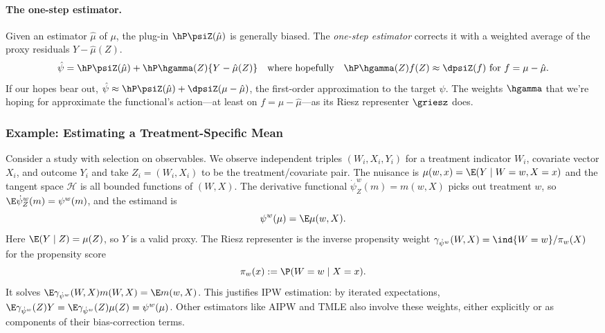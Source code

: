 \documentclass{article}
\begin{document}
\paragraph{The one-step estimator.}
Given an estimator $\hat\mu$ of $\mu$,
the plug-in $\hP \psiZ(\hat\mu)$
is generally biased.
The \emph{one-step estimator} corrects it
with a weighted average of the
proxy residuals $Y - \hat\mu(Z)$.
\begin{equation}\label{eq:one-step}
\hat\psi
  = \hP \psiZ(\hat\mu)
  + \hP \hgamma(Z) \{ Y - \hat\mu(Z) \}
  \qqtext{where hopefully}
  \hP \hgamma(Z) f(Z) \approx \dpsiZ(f)
  \text{ for } f = \mu - \hat\mu.
\end{equation}
If our hopes bear out,
$\hat\psi \approx \hP\psiZ(\hat\mu) + \dpsiZ(\mu - \hat\mu)$,
the first-order approximation
to the target $\psi$.
The weights $\hgamma$ that we're hoping for
approximate the functional's action---at
least on $f = \mu - \hat\mu$---as
its Riesz representer $\griesz$ does.

\subsubsection{Example: Estimating a Treatment-Specific Mean}
\label{ex:treatment-specific-mean}
Consider a study with selection on observables.
We observe independent triples $(W_i,X_i,Y_i)$ for a
treatment indicator $W_i$, covariate vector $X_i$, and
outcome $Y_i$ and take $Z_i=(W_i,X_i)$ to be the
treatment/covariate pair.
The nuisance is $\mu(w,x)=\E(Y \mid W=w,X=x)$
and the tangent space $\mathcal{H}$ is all bounded
functions of $(W,X)$.
The derivative functional $\dot\psi^w_Z(m)=m(w,X)$
picks out treatment $w$, so
$\E \dot\psi^w_Z(m)=\psi^w(m)$, and the estimand is
\begin{equation}\label{eq:tsm-estimand}
\psi^w(\mu) = \E \mu(w,X).
\end{equation}
Here $\E(Y \mid Z) = \mu(Z)$, so $Y$ is a valid proxy.
The Riesz representer is the inverse propensity weight
$\gamma_{\dot\psi^w}(W,X) = \ind{W=w}/\pi_w(X)$
for the propensity score
\begin{equation}\label{eq:tsm-riesz}
\pi_w(x) := \P(W=w \mid X=x).
\end{equation}
It solves
$\E \gamma_{\dot\psi^w}(W,X) m(W,X) = \E m(w,X)$.
This justifies IPW estimation: by iterated expectations,
$\E \gamma_{\dot\psi^w}(Z) Y
  = \E \gamma_{\dot\psi^w}(Z) \mu(Z) = \psi^w(\mu)$.
Other estimators like AIPW and TMLE also involve
these weights, either explicitly or as components
of their bias-correction terms.
\end{document}
